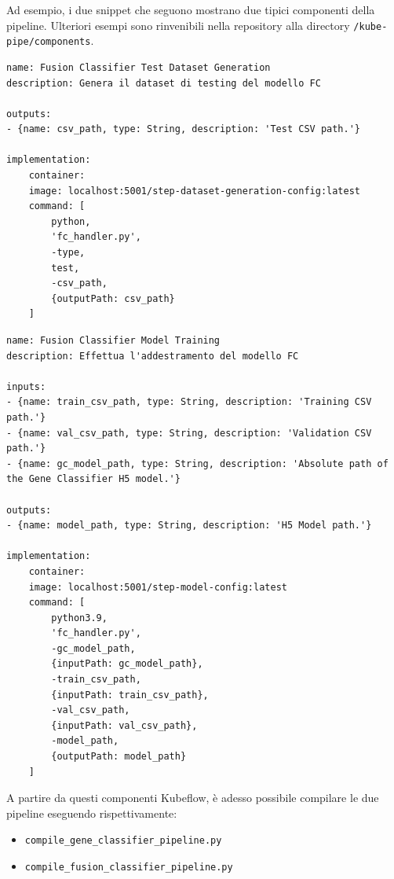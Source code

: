 Ad esempio, i due snippet che seguono mostrano due tipici componenti della pipeline. Ulteriori esempi sono rinvenibili nella repository alla directory {\small \verb|/kube-pipe/components|}.

\begin{code}
\label{code:apx:a:yaml}
\begin{verbatim}
name: Fusion Classifier Test Dataset Generation
description: Genera il dataset di testing del modello FC

outputs:
- {name: csv_path, type: String, description: 'Test CSV path.'}

implementation:
    container:
    image: localhost:5001/step-dataset-generation-config:latest
    command: [
        python,
        'fc_handler.py',
        -type,
        test,
        -csv_path, 
        {outputPath: csv_path}
    ]
\end{verbatim}
\end{code}

\begin{code}
\label{code:apx:a:yaml}
\begin{verbatim}
name: Fusion Classifier Model Training
description: Effettua l'addestramento del modello FC

inputs:
- {name: train_csv_path, type: String, description: 'Training CSV path.'}
- {name: val_csv_path, type: String, description: 'Validation CSV path.'}
- {name: gc_model_path, type: String, description: 'Absolute path of the Gene Classifier H5 model.'}

outputs:
- {name: model_path, type: String, description: 'H5 Model path.'}

implementation:
    container:
    image: localhost:5001/step-model-config:latest
    command: [
        python3.9,
        'fc_handler.py',
        -gc_model_path, 
        {inputPath: gc_model_path},
        -train_csv_path, 
        {inputPath: train_csv_path},
        -val_csv_path, 
        {inputPath: val_csv_path},
        -model_path, 
        {outputPath: model_path}
    ]
\end{verbatim}
\end{code}

A partire da questi componenti Kubeflow, è adesso possibile compilare le due pipeline eseguendo rispettivamente:

\begin{itemize}
    \item {\small \verb|compile_gene_classifier_pipeline.py|} 
    \item {\small \verb|compile_fusion_classifier_pipeline.py|}
\end{itemize}

